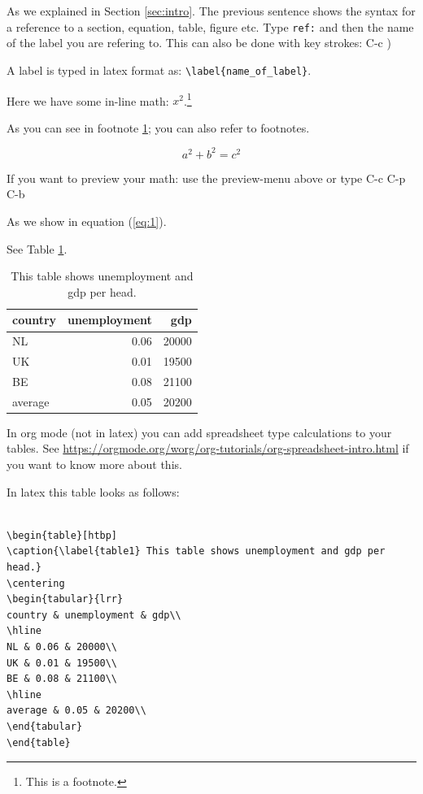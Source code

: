\documentclass[11pt]{article}
\begin{document}
As we explained in Section \ref{sec:intro}. The previous sentence shows the syntax for a reference to a section, equation, table, figure etc. Type \texttt{ref:} and then the name of the label you are refering to. This can also be done with key strokes: C-c )

A label is typed in latex format as: \texttt{\textbackslash{}label\{name\_of\_label\}}. 

Here we have some in-line math: \(x^2\).\footnote{\label{fn:footnote} This is a footnote.}

As you can see in footnote \ref{fn:footnote}; you can also refer to footnotes.


\begin{equation}
\label{eq:1}
a^2 + b^2 = c^2
\end{equation}

If you want to preview your math: use the preview-menu above or type C-c C-p C-b

As we show in equation (\ref{eq:1}).

See Table \ref{table1}.

\begin{table}[htbp]
\caption{\label{table1} This table shows unemployment and gdp per head.}
\centering
\begin{tabular}{lrr}
country & unemployment & gdp\\
\hline
NL & 0.06 & 20000\\
UK & 0.01 & 19500\\
BE & 0.08 & 21100\\
\hline
average & 0.05 & 20200\\
\end{tabular}
\end{table}

In org mode (not in latex) you can add spreadsheet type calculations to your tables. See \url{https://orgmode.org/worg/org-tutorials/org-spreadsheet-intro.html} if you want to know more about this.

In latex this table looks as follows:

\begin{verbatim}

\begin{table}[htbp]
\caption{\label{table1} This table shows unemployment and gdp per head.}
\centering
\begin{tabular}{lrr}
country & unemployment & gdp\\
\hline
NL & 0.06 & 20000\\
UK & 0.01 & 19500\\
BE & 0.08 & 21100\\
\hline
average & 0.05 & 20200\\
\end{tabular}
\end{table}

\end{verbatim}
\end{document}
